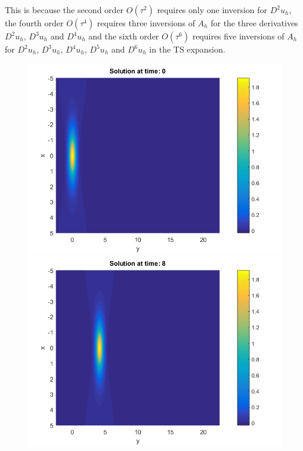 \documentclass[11pt,a4paper,twoside]{article}
\begin{document}
This is because the second order $O(\tau^2)$ requires only one inversion for $D^2 u_h$, the fourth order $O(\tau^4)$ requires three inversions of $A_h$ for the three derivatives $D^2 u_h$, $D^3 u_h$ and $D^4 u_h$ and the sixth order $O(\tau^6)$ requires five inversions of $A_h$ for $D^2 u_h$, $D^3 u_h$, $D^4 u_h$, $D^5 u_h$ and $D^6 u_h$ in the TS expansion.
\begin{figure}[!htbp]
	\centering
	\begin{minipage}[b]{0.31\linewidth}
		\includegraphics[width=\linewidth]{Pictures/Solution_bt3_t=0.png}
	\end{minipage}	
	\begin{minipage}[b]{0.31\linewidth}
		\includegraphics[width=\linewidth]{Pictures/Solution_bt3_t=8.png}

\end{minipage}
\end{figure}
\end{document}
